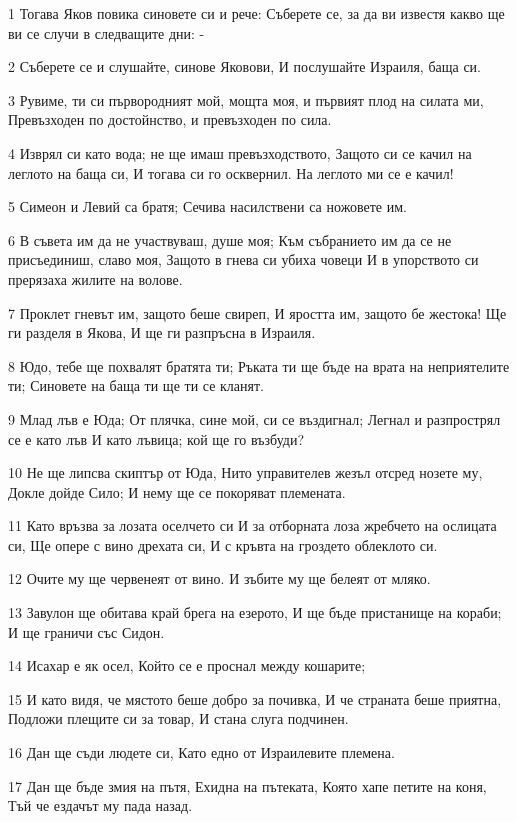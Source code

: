 \par 1 Тогава Яков повика синовете си и рече: Съберете се, за да ви известя какво ще ви се случи в следващите дни: -
\par 2 Съберете се и слушайте, синове Яковови, И послушайте Израиля, баща си.
\par 3 Рувиме, ти си първородният мой, мощта моя, и първият плод на силата ми, Превъзходен по достойнство, и превъзходен по сила.
\par 4 Изврял си като вода; не ще имаш превъзходството, Защото си се качил на леглото на баща си, И тогава си го осквернил. На леглото ми се е качил!
\par 5 Симеон и Левий са братя; Сечива насилствени са ножовете им.
\par 6 В съвета им да не участвуваш, душе моя; Към събранието им да се не присъединиш, славо моя, Защото в гнева си убиха човеци И в упорството си прерязаха жилите на волове.
\par 7 Проклет гневът им, защото беше свиреп, И яростта им, защото бе жестока! Ще ги разделя в Якова, И ще ги разпръсна в Израиля.
\par 8 Юдо, тебе ще похвалят братята ти; Ръката ти ще бъде на врата на неприятелите ти; Синовете на баща ти ще ти се кланят.
\par 9 Млад лъв е Юда; От плячка, сине мой, си се въздигнал; Легнал и разпрострял се е като лъв И като лъвица; кой ще го възбуди?
\par 10 Не ще липсва скиптър от Юда, Нито управителев жезъл отсред нозете му, Докле дойде Сило; И нему ще се покоряват племената.
\par 11 Като връзва за лозата оселчето си И за отборната лоза жребчето на ослицата си, Ще опере с вино дрехата си, И с кръвта на гроздето облеклото си.
\par 12 Очите му ще червенеят от вино. И зъбите му ще белеят от мляко.
\par 13 Завулон ще обитава край брега на езерото, И ще бъде пристанище на кораби; И ще граничи със Сидон.
\par 14 Исахар е як осел, Който се е проснал между кошарите;
\par 15 И като видя, че мястото беше добро за почивка, И че страната беше приятна, Подложи плещите си за товар, И стана слуга подчинен.
\par 16 Дан ще съди людете си, Като едно от Израилевите племена.
\par 17 Дан ще бъде змия на пътя, Ехидна на пътеката, Която хапе петите на коня, Тъй че ездачът му пада назад.
